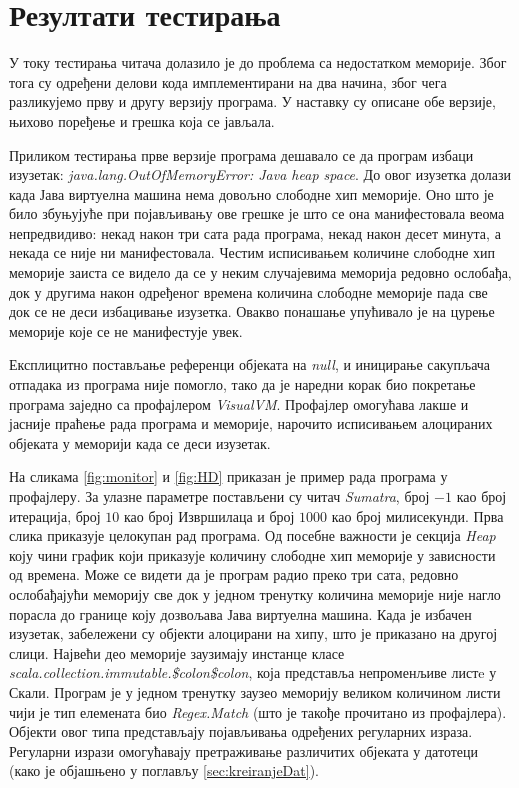 \documentclass[12pt,oneside]{memoir}
\begin{document}
\section{Резултати тестирања}
\label{sec:rez}

У току тестирања читача долазило је до проблема са недостатком меморије. Због тога су одређени делови кода имплементирани на два начина, због чега разликујемо прву и другу верзију програма. У наставку су описане обе верзије, њихово поређење и грешка која се јављала.

Приликом тестирања прве верзије програма дешавало се да програм избаци изузетак: \textit{java.lang.OutOfMemoryError: Java heap space}. До овог изузетка долази када Јава виртуелна машина нема довољно слободне хип меморије. Оно што је било збуњујуће при појављивању ове грешке је што се она манифестовала веома непредвидиво: некад након три сата рада програма, некад након десет минута, а некада се није ни манифестовала. Честим исписивањем количине слободне хип меморије заиста се видело да се у неким случајевима меморија редовно ослобађа, док у другима након одређеног времена количина слободне меморије пада све док се не деси избацивање изузетка. Овакво понашање упућивало је на цурење меморије које се не манифестује увек.

Експлицитно постављање референци објеката на \textit{null}, и иницирање сакупљача отпадака из програма није помогло, тако да је наредни корак био покретање програма заједно са профајлером \textit{VisualVM}. Профајлер омогућава лакше и јасније праћење рада програма и меморије, нарочито исписивањем алоцираних објеката у меморији када се деси изузетак. 

На сликама \ref{fig:monitor} и \ref{fig:HD} приказан је пример рада програма у профајлеру. За улазне параметре постављени су читач \textit{Sumatra}, број $-1$ као број итерација, број $10$ као број Извршилаца и број $1000$ као број милисекунди. Прва слика приказује целокупан рад програма. Од посебне важности је секција \textit{Heap} коју чини график који приказује количину слободне хип меморије у зависности од времена. Може се видети да је програм радио преко три сата, редовно ослобађајући меморију све док у једном тренутку количина меморије није нагло порасла до границе коју дозвољава Јава виртуелна машина. Када је избачен изузетак, забележени су објекти алоцирани на хипу, што је приказано на другој слици. Највећи део меморије заузимају инстанце класе \textit{scala.collection.immutable.\$colon\$colon}, која представља непроменљиве листe у Скали. Програм је у једном тренутку заузео меморију великом количином листи чији је тип елемената био \textit{Regex.Match} (што је такође прочитано из профајлера). Објекти овог типа представљају појављивања одређених регуларних израза. Регуларни изрази  омогућавају претраживање различитих објеката у датотеци (како је објашњено у поглављу \ref{sec:kreiranjeDat}).
\end{document}
